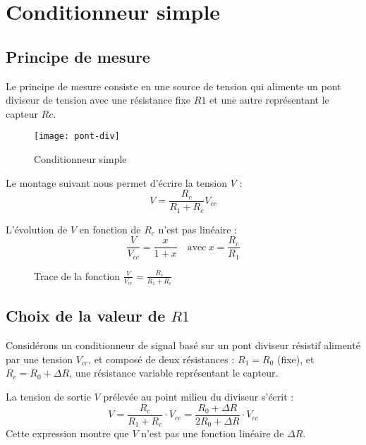
\section{Conditionneur simple}
\subsection{Principe de mesure}

Le principe de mesure consiste en une source de tension qui alimente un pont diviseur
de tension avec une résistance fixe \(R1\) et une autre représentant le capteur \(Rc\).

\begin{figure}[H]
    \centering
    \texttt{[image: pont-div]}
    \caption{Conditionneur simple}
    \label{fig:conditionneur}
\end{figure}

Le montage suivant nous permet d’écrire la tension \(V\) :
\[
    V=\frac{R_c}{R_1+R_c}V_{cc}
\]

L’évolution de \(V\) en fonction de \(R_c\) n’est pas linéaire :
\[
    \frac{V}{V_{cc}}=\frac{x}{1+x}\quad\text{avec}\ x=\frac{R_c}{R_1}
\]

\begin{figure}[H]
    \caption{Trace de la fonction \(\frac{V}{V_{cc}}=\frac{R_c}{R_1+R_c}\)}
    \label{fig:cond-simple}
\end{figure}

\subsection{Choix de la valeur de \(R1\)}

Considérons un conditionneur de signal basé sur un pont diviseur résistif 
alimenté par une tension \( V_{cc} \), et composé de deux résistances : 
\( R_1 = R_0 \) (fixe), et \( R_c = R_0 + \Delta R \), une résistance variable 
représentant le capteur.

La tension de sortie \( V \) prélevée au point milieu du diviseur s’écrit :
\[
V = \frac{R_c}{R_1 + R_c} \cdot V_{cc} = \frac{R_0 + \Delta R}{2R_0 + \Delta R} \cdot V_{cc}
\]
Cette expression montre que \( V \) n’est pas une fonction linéaire de \( \Delta R \).


